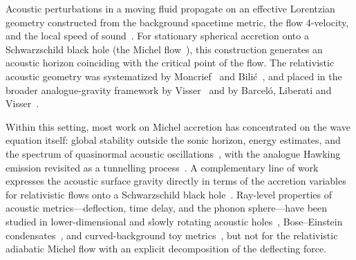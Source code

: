 \documentclass[12pt,a4paper,preprint]{elsarticle}
\begin{document}
        Acoustic perturbations in a moving fluid propagate on an effective Lorentzian geometry constructed from the background spacetime metric, the flow 4-velocity, and the local speed of sound~\cite{UnruhWG_ExperimentalBlackHoleEvaporation_1981, VisserM_AcousticBlackHolesHorizonsErgospheresAndHawkingRadiation_1998, BarceloC_LiberatiS_VisserM_AnalogueGravity_2011}. For stationary spherical accretion onto a Schwarzschild black hole (the Michel flow~\cite{MichelFC_AccretionOfMatterByCondensedObjects_1972}), this construction generates an acoustic horizon coinciding with the critical point of the flow. The relativistic acoustic geometry was systematized by Moncrief~\cite{MoncriefV_StabilityOfStationarySphericalAccretionOntoASchwarzschildBlackHole_1980} and Bili{\'c}~\cite{BilicN_RelativisticAcousticGeometry_1999}, and placed in the broader analogue-gravity framework by Visser~\cite{VisserM_AcousticBlackHolesHorizonsErgospheresAndHawkingRadiation_1998} and by Barcel{\'o}, Liberati and Visser~\cite{BarceloC_LiberatiS_VisserM_AnalogueGravity_2011}.
        
        Within this setting, most work on Michel accretion has concentrated on the wave equation itself: global stability outside the sonic horizon, energy estimates, and the spectrum of quasinormal acoustic oscillations~\cite{MoncriefV_StabilityOfStationarySphericalAccretionOntoASchwarzschildBlackHole_1980, ChaverraE_MoralesMD_SarbachO_QuasinormalAcousticOscillationsInTheMichelFlow_2015}, with the analogue Hawking emission revisited as a tunnelling process~\cite{JangidN_RayAK_AcousticHawkingRadiationAsATunnellingEffectInMichelAccretion_2026}. A complementary line of work expresses the acoustic surface gravity directly in terms of the accretion variables for relativistic flows onto a Schwarzschild black hole~\cite{DasTK_BilicN_DasguptaS_BlackHoleAccretionDiscAsAnAnalogueGravityModel_2007, TarafdarP_DasTK_GeometricConfigurationOfMatterForAxiallySymmetricBackgroundFlowsInTheSchwarzschildMetric_2013, ShaikhMA_FirdousiI_DasTK_RelativisticSonicGeometryForIsothermalAccretionInTheSchwarzschildMetric_2017}. Ray-level properties of acoustic metrics---deflection, time delay, and the phonon sphere---have been studied in lower-dimensional and slowly rotating acoustic holes~\cite{ToshmatovB_AhmedovB_StuchlikZ_PhononMotionAround21DimensionalAcousticBlackHole_2023, BalaliAE_MarraniA_LenseThirringAcousticBlackHolesShadowsAndLight_2025}, Bose--Einstein condensates~\cite{VieiraHS_DestounisK_KokkotasKD_AnalogSchwarzschildBlackHolesOfBoseEinsteinCondensatesInACavityQuasinormalModesAndQuasiboundStates_2023}, and curved-background toy metrics~\cite{PalK_PalK_SarkarT_AnalogueMetricInABlackBounceBackground_2022}, but not for the relativistic adiabatic Michel flow with an explicit decomposition of the deflecting force.
        
\end{document}
